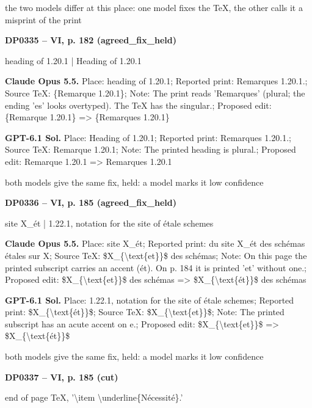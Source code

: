 the two models differ at this place: one model fixes the TeX, the other calls it a misprint of the print\par
\par\noindent\hypertarget{DP0335}{}\textbf{DP0335 -- VI, p. 182 (agreed\_fix\_held)}\par
heading of 1.20.1 | Heading of 1.20.1\par
\textbf{Claude Opus 5.5.} Place: heading of 1.20.1; Reported print: Remarques 1.20.1.; Source TeX: \{Remarque 1.20.1\}; Note: The print reads 'Remarques' (plural; the ending 'es' looks overtyped). The TeX has the singular.; Proposed edit: \{Remarque 1.20.1\} =\allowbreak > \{Remarques 1.20.1\}\par
\textbf{GPT-6.1 Sol.} Place: Heading of 1.20.1; Reported print: Remarques 1.20.1.; Source TeX: Remarque 1.20.1; Note: The printed heading is plural.; Proposed edit: Remarque 1.20.1 =\allowbreak > Remarques 1.20.1\par
both models give the same fix, held: a model marks it low confidence\par
\par\noindent\hypertarget{DP0336}{}\textbf{DP0336 -- VI, p. 185 (agreed\_fix\_held)}\par
site X\_ét | 1.22.1, notation for the site of étale schemes\par
\textbf{Claude Opus 5.5.} Place: site X\_ét; Reported print: du site X\_ét des schémas étales sur X; Source TeX: \$X\_\{\textbackslash{}text\{et\}\}\$ des schémas; Note: On this page the printed subscript carries an accent (ét). On p. 184 it is printed 'et' without one.; Proposed edit: \$X\_\{\textbackslash{}text\{et\}\}\$ des schémas =\allowbreak > \$X\_\{\textbackslash{}text\{ét\}\}\$ des schémas\par
\textbf{GPT-6.1 Sol.} Place: 1.22.1, notation for the site of étale schemes; Reported print: \$X\_\{\textbackslash{}text\{ét\}\}\$; Source TeX: \$X\_\{\textbackslash{}text\{et\}\}\$; Note: The printed subscript has an acute accent on e.; Proposed edit: \$X\_\{\textbackslash{}text\{et\}\}\$ =\allowbreak > \$X\_\{\textbackslash{}text\{ét\}\}\$\par
both models give the same fix, held: a model marks it low confidence\par
\par\noindent\hypertarget{DP0337}{}\textbf{DP0337 -- VI, p. 185 (cut)}\par
end of page TeX, '\textbackslash{}item \textbackslash{}underline\{Nécessité\}.'\par
